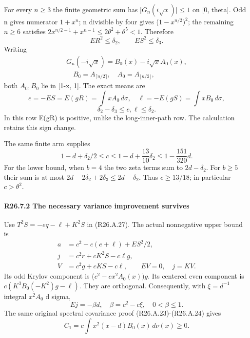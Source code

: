 For every \(n\ge 3\) the finite geometric sum has |\(G_n(i \sqrt{x})|\le 1\) on
[0, theta]. Odd n gives numerator \(1+x^n\); n divisible by four gives
(\(1-x^{n/2})^2\); the remaining \(n\ge 6\) satisfies
\(2x^{n/2-1}+x^{n-1}\le 2\theta^2+\theta^5<1.\) Therefore
\[
ER^2\le \delta_2,\qquad ES^2\le \delta_3.                 \tag{R26.A.28}
\]
Writing
\[
\begin{gathered}
G_n(-i\sqrt x)=B_0(x)-i\sqrt xA_0(x),\\
\quad B_0=A_{\lceil n/2\rceil},\quad A_0=A_{\lfloor n/2\rfloor},
\end{gathered}
\]
both \(A_0,\allowbreak  B_0\) lie in [1-x, 1]. The exact means are
\[
e=-ES=E(gR)=\int xA_0\,d\sigma,\quad
\ell=-E(gS)=\int xB_0\,d\sigma,
\]
\[
\delta_2-\delta_3\le e,\ell\le \delta_2.                       \tag{R26.A.29}
\]
In this row E(gR) is positive, unlike the long-inner-path row. The
calculation retains this sign change.

The same finite arm supplies
\[
1-d+\delta_2/2\le c\le1-d+\frac{13}{10}\delta_2
\le1-\frac{151}{320}d.
\]
For the lower bound, when \(b=4\) the two zeta terms sum to \(2d-\delta_2.\)
For \(b\ge 5\) their sum is at most \(2d-2\delta_2+2\delta_3\le 2d-\delta_2.\)
Thus \(c\ge 13/18\); in particular \(c>\theta^2.\)

\paragraph{R26.7.2 The necessary variance improvement survives}\label{part:R26.7.2}

Use \(T^2S=-e q-\ell+K^2S\) in (R26.A.27). The actual nonnegative upper bound is
\[
\begin{aligned}
a&=c^2-c(e+\ell)+ES^2/2,\\
j&=c^2r+cK^2S-c\ell g,\\
V&=c^2g+cKS-c\ell,\qquad EV=0,\quad j=KV.
\end{aligned}                                                        \tag{R26.A.30}
\]
Its odd Krylov component is (\(c^2-cx^2A_0(x))g.\) Its centered even component
is \(c(K^3B_0(-K^2)g-\ell).\) They are orthogonal. Consequently, with
\(\xi= d^{-1}\) integral \(x^2A_0\) d sigma,
\[
Ej=-\beta d,\quad\beta=c^2-c\xi,\quad0<\beta\le1.
\]
The same original spectral covariance proof (R26.A.23)-(R26.A.24) gives
\[
C_1=c\int x^2(x-d)B_0(x)\,d\nu(x)\ge0.
\]

